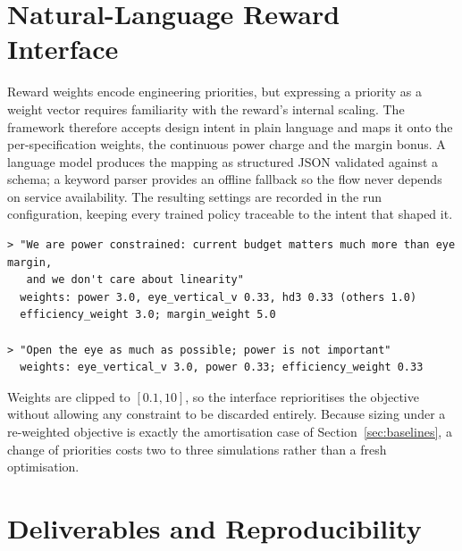 \documentclass[10pt,a4paper]{article}
\newcommand{\code}[1]{\texttt{\small #1}}
\begin{document}


\section{Natural-Language Reward Interface}
\label{sec:llm}

Reward weights encode engineering priorities, but expressing a priority as a
weight vector requires familiarity with the reward's internal scaling. The
framework therefore accepts design intent in plain language and maps it onto the
per-specification weights, the continuous power charge and the margin bonus. A
language model produces the mapping as structured JSON validated against a
schema; a keyword parser provides an offline fallback so the flow never depends
on service availability. The resulting settings are recorded in the run
configuration, keeping every trained policy traceable to the intent that shaped
it.

\begin{lstlisting}
> "We are power constrained: current budget matters much more than eye margin,
   and we don't care about linearity"
  weights: power 3.0, eye_vertical_v 0.33, hd3 0.33 (others 1.0)
  efficiency_weight 3.0; margin_weight 5.0

> "Open the eye as much as possible; power is not important"
  weights: eye_vertical_v 3.0, power 0.33; efficiency_weight 0.33
\end{lstlisting}

Weights are clipped to $[0.1, 10]$, so the interface reprioritises the objective
without allowing any constraint to be discarded entirely. Because sizing under a
re-weighted objective is exactly the amortisation case of
Section~\ref{sec:baselines}, a change of priorities costs two to three
simulations rather than a fresh optimisation.

\section{Deliverables and Reproducibility}
\label{sec:deliverables}
\end{document}
